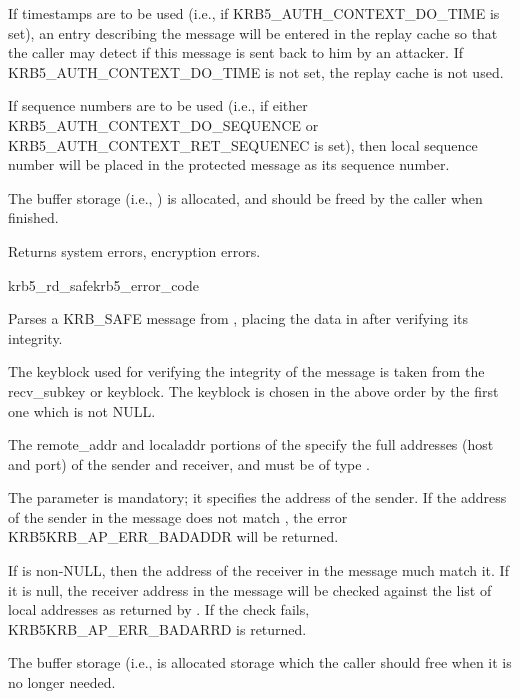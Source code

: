 If timestamps are to be used (i.e., if KRB5_AUTH_CONTEXT_DO_TIME is
set), an entry describing the message will be entered in the replay
cache so that the caller may detect if this message is sent
back to him by an attacker.  If KRB5_AUTH_CONTEXT_DO_TIME is not set,
the  replay cache is not used.

If sequence numbers are to be used (i.e., if either
KRB5_AUTH_CONTEXT_DO_SEQUENCE or KRB5_AUTH_CONTEXT_RET_SEQUENEC is
set), then  local sequence number will be
placed in the protected message as its sequence number.  

The  buffer storage (i.e.,
) is allocated, and should be freed by
the caller when finished.

Returns system errors, encryption errors.

\begin{funcdecl}{krb5_rd_safe}{krb5_error_code}{\funcinout}
\funcin
{}
\funcout
{}
\funcinout
{}
\end{funcdecl}

Parses a KRB_SAFE message from , placing the
data in  after verifying its integrity.

The keyblock used for verifying the integrity of the message is taken
from the  recv\_subkey or keyblock. The
keyblock is chosen in the above order by the first one which is not
NULL.
 
The remote_addr and localaddr portions of the 
specify the full addresses (host and port) of the sender and receiver,
and must be of type .


The  parameter is mandatory; it
specifies the address of the sender.  If the address of the sender in
the message does not match , the error
KRB5KRB_AP_ERR_BADADDR will be returned.

If  is non-NULL, then the address of the receiver
in the message much match it.  If it is null, the receiver address in
the message will be checked against the list of local addresses as
returned by . If the check fails,
KRB5KRB_AP_ERR_BADARRD is returned.

The  buffer storage (i.e.,
 is allocated storage which the caller
should free when it is no longer needed.

